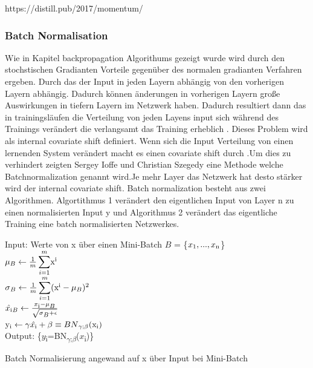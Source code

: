 \documentclass{llncs}
\begin{document}
https://distill.pub/2017/momentum/

\subsubsection{Batch Normalisation}

Wie in Kapitel backpropagation Algorithums gezeigt wurde wird durch den stochstischen Gradianten Vorteile gegenüber des normalen gradianten Verfahren ergeben. Durch das der Input in jeden Layern abhängig von den vorherigen Layern abhängig. Dadurch können änderungen in vorherigen Layern große Auswirkungen in tiefern Layern im Netzwerk haben. Dadurch resultiert dann das in trainingsläufen die Verteilung von jeden Layens input sich während des Trainings verändert die verlangsamt das Training erheblich \cite{batchnorm}. Dieses Problem wird als internal covariate shift definiert. Wenn sich die Input Verteilung von einen lernenden System verändert macht es einen covariate shift durch \cite{batchnorm}.Um dies zu verhindert zeigten Sergey Ioffe und Christian Szegedy \cite{batchnorm} eine Methode welche Batchnormalization genannt wird.Je mehr Layer das Netzwerk hat desto stärker wird der internal covariate shift. Batch normalization besteht aus zwei Algorithmen. Algortithmus 1 verändert den eigentlichen Input von Layer n zu einen normalisierten Input y und Algorithmus 2 verändert das eigentliche Training eine batch normalisierten Netzwerkes.

\begin{algorithm}[H]
Input: Werte von x über einen Mini-Batch $B$ = \{$x\textsubscript{1},...,x\textsubscript{n}$\}\\
\begin{math}
\mu\textsubscript{$B$}\leftarrow\frac{1}{m}\displaystyle\sum_{i=1}^{m}$x$\textsuperscript{i}
\end{math}\\
\begin{math}
\sigma\textsubscript{$B$}\leftarrow\frac{1}{m}\displaystyle\sum_{i=1}^{m}($x$\textsuperscript{i} - \mu\textsubscript{$B$})\textsuperscript{2}
\end{math}\\
\begin{math}
\hat{x\textsubscript{i}}\textsubscript{$B$}\leftarrow\frac{x\textsubscript{i}-\mu\textsubscript{$B$}}{\sqrt{\sigma\textsubscript{$B$} + \epsilon}}
\end{math}\\
\begin{math}
$y$\textsubscript{i}\leftarrow\gamma\hat{x\textsubscript{i}} + \beta \equiv BN\textsubscript{$\gamma$;$\beta$}($x$\textsubscript{i})
\end{math}\\
Output: \{$y$\textsubscript{i}=BN\textsubscript{$\gamma$;$\beta$}($x$\textsubscript{i})\}
\caption{Batch Normalisierung angewand auf x über Input bei Mini-Batch  }	
\end{algorithm}
\end{document}
